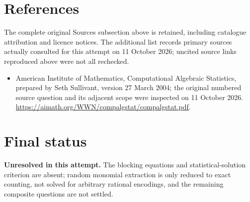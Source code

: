 \documentclass[11pt]{article}
\begin{document}
\section{References}
The complete original Sources subsection above is retained, including catalogue attribution and licence notices. The additional list records primary sources actually consulted for this attempt on 11 October 2026; uncited source links reproduced above were not all rechecked.
\begin{itemize}
\item American Institute of Mathematics, Computational Algebraic Statistics, prepared by Seth Sullivant, version 27 March 2004; the original numbered source question and its adjacent scope were inspected on 11 October 2026. \url{https://aimath.org/WWN/compalgstat/compalgstat.pdf}.
\end{itemize}
\section{Final status}
\textbf{Unresolved in this attempt.} The blocking equations and statistical-solution criterion are absent; random monomial extraction is only reduced to exact counting, not solved for arbitrary rational encodings, and the remaining composite questions are not settled.
\end{document}
